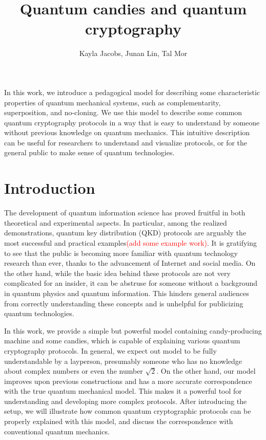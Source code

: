 \documentclass{article}
\def \todo #1{\textcolor{red}{#1}}
\begin{document}
\title{Quantum candies and quantum cryptography}
\author{Kayla Jacobs, Junan Lin, Tal Mor}
\date{}

\maketitle


In this work, we introduce a pedagogical model for describing some characteristic properties of quantum mechanical systems, such as complementarity, superposition, and no-cloning.
We use this model to describe some common quantum cryptography protocols in a way that is easy to understand by someone without previous knowledge on quantum mechanics.
This intuitive description can be useful for researchers to understand and visualize protocols, or for the general public to make sense of quantum technologies.



\section{Introduction}
The development of quantum information science has proved fruitful in both theoretical and experimental aspects.
In particular, among the realized demonstrations, quantum key distribution (QKD) protocols are arguably the most successful and practical examples\todo{(add some example work)}.
It is gratifying to see that the public is becoming more familiar with quantum technology research than ever, thanks to the advancement of Internet and social media.
On the other hand, while the basic idea behind these protocols are not very complicated for an insider, it can be abstruse for someone without a background in quantum physics and quantum information.
This hinders general audiences from correctly understanding these concepts and is unhelpful for publicizing quantum technologies.

In this work, we provide a simple but powerful model containing candy-producing machine and some candies, which is capable of explaining various quantum cryptography protocols.
In general, we expect out model to be fully understandable by a layperson, presumably someone who has no knowledge about complex numbers or even the number $\sqrt{2}$.
On the other hand, our model improves upon previous constructions and has a more accurate correspondence with the true quantum mechanical model.
This makes it a powerful tool for understanding and developing more complex protocols.
After introducing the setup, we will illustrate how common quantum cryptographic protocols can be properly explained with this model, and discuss the correspondence with conventional quantum mechanics.
\end{document}
